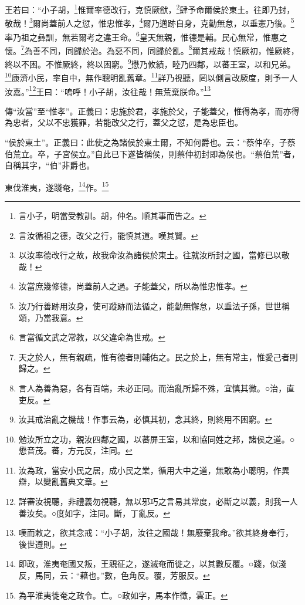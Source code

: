 王若曰：“小子胡，\footnote{言小子，明當受教訓。胡，仲名。順其事而告之。}惟爾率德改行，克慎厥猷，\footnote{言汝循祖之德，改父之行，能慎其道。嘆其賢。}肆予命爾侯於東土。往即乃封，敬哉！\footnote{以汝率德改行之故，故我命汝為諸侯於東土。往就汝所封之國，當修已以敬哉！}爾尚蓋前人之愆，惟忠惟孝，\footnote{汝當庶幾修德，尚蓋前人之過。子能蓋父，所以為惟忠惟孝。}爾乃邁跡自身，克勤無怠，以垂憲乃後。\footnote{汝乃行善跡用汝身，使可蹤跡而法循之，能勤無懈怠，以垂法子孫，世世稱頌，乃當我意。}率乃祖之彝訓，無若爾考之違王命。\footnote{言當循文武之常教，以父違命為世戒。}皇天無親，惟德是輔。民心無常，惟惠之懷。\footnote{天之於人，無有親疏，惟有德者則輔佑之。民之於上，無有常主，惟愛己者則歸之。}為善不同，同歸於治。為惡不同，同歸於亂。\footnote{言人為善為惡，各有百端，未必正同。而治亂所歸不殊，宜慎其微。○治，直吏反。}爾其戒哉！慎厥初，惟厥終，終以不困。不惟厥終，終以困窮。\footnote{汝其戒治亂之機哉！作事云為，必慎其初，念其終，則終用不困窮。}懋乃攸績，睦乃四鄰，以蕃王室，以和兄弟。\footnote{勉汝所立之功，親汝四鄰之國，以蕃屏王室，以和協同姓之邦，諸侯之道。○懋音茂。蕃，方元反，注同。}康濟小民，率自中，無作聰明亂舊章。\footnote{汝為政，當安小民之居，成小民之業，循用大中之道，無敢為小聰明，作異辯，以變亂舊典文章。}詳乃視聽，罔以側言改厥度，則予一人汝嘉。”\footnote{詳審汝視聽，非禮義勿視聽，無以邪巧之言易其常度，必斷之以義，則我一人善汝矣。○度如字，注同。斷，丁亂反。}王曰：“嗚呼！小子胡，汝往哉！無荒棄朕命。”\footnote{嘆而敕之，欲其念戒：“小子胡，汝往之國哉！無廢棄我命。”欲其終身奉行，後世遵則。}


{\noindent\zhuan{}\fzbyks 傳“汝當”至“惟孝”。正義曰：忠施於君，孝施於父，子能蓋父，惟得為孝，而亦得為忠者，父以不忠獲罪，若能改父之行，蓋父之愆，是為忠臣也。 \par}

{\noindent\shu{}\fzkt “侯於東土”。正義曰：此使之為諸侯於東土爾，不知何爵也。云：“蔡仲卒，子蔡伯荒立。卒，子宮侯立。”自此已下遂皆稱侯，則蔡仲初封即為侯也。“蔡伯荒”者，自稱其字，“伯”非爵也。 \par}

東伐淮夷，遂踐奄，\footnote{即政，淮夷奄國又叛，王親征之，遂滅奄而徙之，以其數反覆。○踐，似淺反，馬同，云：“藉也。”數，色角反。覆，芳服反。}作。\footnote{為平淮夷徙奄之政令。亡。○政如字，馬本作徵，雲正。}


